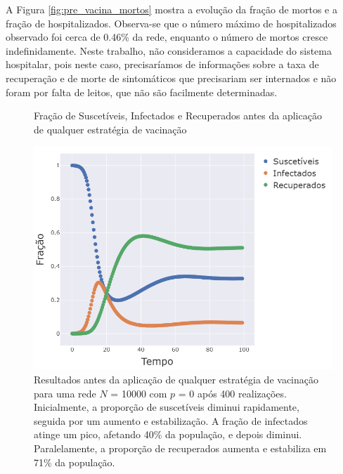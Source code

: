 A Figura \ref{fig:pre_vacina_mortos} mostra a evolução  da fração de mortos e a fração de hospitalizados. Observa-se que o número máximo de hospitalizados observado foi cerca de 0.46\% da rede, enquanto o número de mortos cresce indefinidamente. Neste trabalho, não consideramos a capacidade do sistema hospitalar, pois neste caso, precisaríamos de informações sobre a taxa de recuperação e de morte de sintomáticos que precisariam ser internados e não foram por falta de leitos, que não são facilmente determinadas.   

\begin{figure}[H]
    \centering
    \captionsetup{font=normalsize,skip=0.8pt,singlelinecheck=on,labelsep=endash}
    \caption{Fração de Suscetíveis, Infectados e Recuperados antes da aplicação de qualquer estratégia de vacinação}
    \includegraphics[scale= 0.4]{figuras/pre_vacina_nponderado.png}
    \captionsetup{font=small,justification=justified}
    \caption*{Resultados antes da aplicação de qualquer 
    estratégia de vacinação para uma rede $N$ = 10000 com $p $ = 0 após 400 realizações. Inicialmente, a proporção de suscetíveis diminui rapidamente, seguida por um aumento e estabilização. A fração de infectados atinge um pico, afetando 
    40\% da população, e depois diminui. Paralelamente, a proporção de recuperados aumenta e estabiliza em 71\% da população.}
    \label{fig:pre_vacina}
\end{figure}

